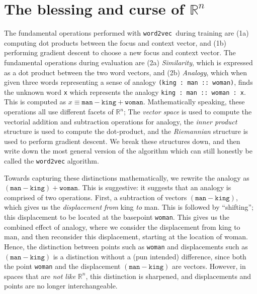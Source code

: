 \documentclass[11pt]{book}
\newcommand{\wtov}{\texttt{word2vec }}
\newcommand{\R}{\ensuremath{\mathbb R}}
\begin{document}
\section{The blessing and curse of $\mathbb{R}^n$}

The fundamental operations performed with \wtov during training are
(1a) computing dot products between the focus and context vector, and (1b)
performing gradient descent to choose a new focus and context vector. The fundamental
operations during evaluation are (2a) \emph{Similarity}, which is
expressed as a dot product between the two word vectors, and (2b) \emph{Analogy},
which when given three words representing a sense of analogy \texttt{(king : man :: woman)},
finds the unknown word \texttt{x} which represents the analogy \texttt{king :
man :: woman : x}. This is computed as $x \equiv \texttt{man} - \texttt{king} +
\texttt{woman}$. Mathematically speaking, these operations all use
different facets of $\R^n$; The \emph{vector space} is used to compute
the vectorial addition and subtraction operations for analogy, the \emph{inner product}
structure is used to compute the dot-product, and the \emph{Riemannian} structure is used to perform
gradient descent. We break these structures down, and then write down the most
general version of the algorithm which can still honestly be called the \texttt{word2vec} algorithm.

Towards capturing these distinctions mathematically,
we rewrite the analogy as $(\texttt{man} - \texttt{king}) + \texttt{woman}$.
This is suggestive: it suggests that an analogy is comprised of two operations. First,
a subtraction of vectors $(\texttt{man}-\texttt{king})$, which gives us the \emph{displacement}
\emph{from} king \emph{to} man. This is followed by ``shifting''; this displacement to be
located at the basepoint \texttt{woman}. This gives us the combined effect of analogy, where
we consider the displacement from king to man, and then reconsider this displacement, starting
at the location of woman. Hence, the distinction between points such as \texttt{woman}
and displacements such as $(\texttt{man} - \texttt{king})$
is a distinction without a (pun intended) difference, since both the point \texttt{woman}
and the displacement $(\texttt{man} - \texttt{king})$ are vectors. However, in spaces
that are \emph{not like} $\R^n$, this distinction is sharpened, and displacements and points
are no longer interchangeable.

\end{document}
